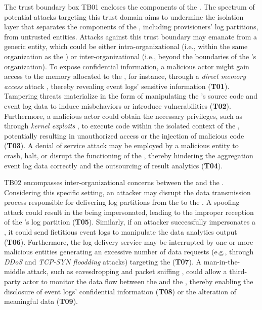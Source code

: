 \begin{newj}
The trust boundary box TB01 encloses the components of the . The spectrum of potential attacks targeting this trust domain aims to undermine the isolation layer that separates the components of the , including provisioners' log partitions, from untrusted entities. Attacks against this trust boundary may emanate from a generic entity, which could be either intra-organizational (i.e., within the same organization as the ) or inter-organizational (i.e., beyond the boundaries of the 's organization). To expose confidential information, a malicious actor might gain access to the memory allocated to the , for instance, through a \textit{direct memory access} attack \cite{DBLP:conf/cms/EckertPK13}, thereby revealing event logs' sensitive information (\textbf{T01}). Tampering threats materialize in the form of manipulating the 's source code and event log data to induce misbehaviors or introduce vulnerabilities (\textbf{T02}). Furthermore, a malicious actor could obtain the necessary privileges, such as through \textit{kernel exploits} \cite{DBLP:conf/securecomm/XiaoHW15a}, to execute code within the isolated context of the , potentially resulting in unauthorized access or the injection of malicious code (\textbf{T03}). A denial of service attack may be employed by a malicious entity to crash, halt, or disrupt the functioning of the , thereby hindering the aggregation event log data correctly and the outsourcing of result analytics (\textbf{T04}). 

TB02  encompasses inter-organizational concerns between the  and the . Considering this specific setting, an attacker may disrupt the data transmission process responsible for delivering log partitions from the  to the . A spoofing attack could result in the  being impersonated, leading to the improper reception of the 's log partition (\textbf{T05}). Similarly, if an attacker successfully impersonates a , it could send fictitious event logs to manipulate the data analytics output (\textbf{T06}). Furthermore, the log delivery service may be interrupted by one or more malicious entities generating an excessive number of data requests (e.g., through \textit{DDoS} \cite{DBLP:journals/ijdsn/MahjabinXSJ17} and \textit{TCP-SYN floodding} \cite{DBLP:journals/wpc/SwamiDR21} attacks) targeting the  (\textbf{T07}). A man-in-the-middle attack, such as eavesdropping and packet sniffing \cite{DBLP:journals/jocs/LiXDZCW15}, could allow a third-party actor to monitor the data flow between the  and the , thereby enabling the disclosure of event logs' confidential information (\textbf{T08}) or the alteration of meaningful data (\textbf{T09}).


\end{newj}
